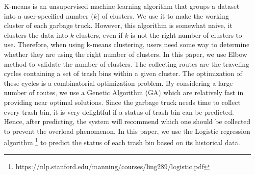 \documentclass[conference]{IEEEtran}
\begin{document}
\par K-means \cite{Kanungo2003} is an unsupervised machine learning algorithm that groups a dataset into a user-specified number ($k$) of clusters. We use it to make the working cluster of each garbage truck. However, this algorithm is somewhat naive, it clusters the data into $k$ clusters, even if $k$ is not the right number of clusters to use. Therefore, when using k-means clustering, users need some way to determine whether they are using the right number of clusters. In this paper, we use Elbow method \cite{Kodinariya2013} \cite{Maria2001} to validate the number of clusters. The collecting routes are the traveling cycles containing a set of trash bins within a given cluster. The optimization of these cycles is a combinatorial optimization problem. By considering a large number of routes, we use a Genetic Algorithm (GA) \cite{Gutierrez2008} which are relatively fast in providing near optimal solutions. Since the garbage truck needs time to collect every trash bin, it is very delightful if a status of trash bin can be predicted. Hence, after predicting, the system will recommend which one should be collected to prevent the overload phenomenon. In this paper, we use the Logistic regression algorithm \footnote{https://nlp.stanford.edu/manning/courses/ling289/logistic.pdf} to predict the status of each trash bin based on its historical data.
\end{document}

